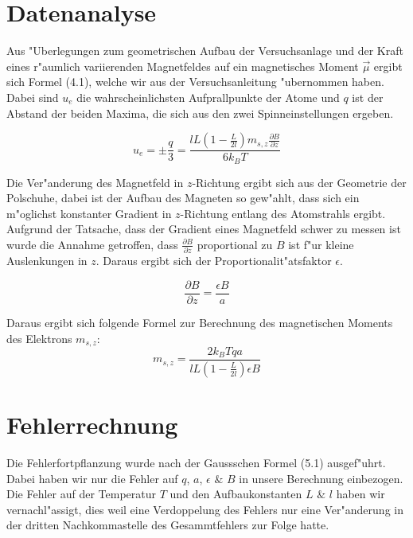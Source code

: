 \documentclass[a4paper,parskip,11pt, DIV12]{scrreprt}
\begin{document}
\clearpage


\chapter{Datenanalyse}\label{Datenanalyse}

Aus "Uberlegungen zum geometrischen Aufbau der Versuchsanlage und der Kraft eines r"aumlich variierenden Magnetfeldes auf ein magnetisches Moment $\vec{ \mu }$ ergibt sich Formel (4.1), welche wir aus der Versuchsanleitung "ubernommen haben. Dabei sind $u_e$ die wahrscheinlichsten Aufprallpunkte der Atome und $q$ ist der Abstand der beiden Maxima, die sich aus den zwei Spinneinstellungen ergeben.


\begin{equation}
u_e=\pm \frac{q}{3}=\frac{lL(1-\frac{L}{2l})m_{s,z} \frac{\partial B}{\partial z}}{6k_BT}
\end{equation}

Die Ver"anderung des Magnetfeld in $z$-Richtung ergibt sich aus der Geometrie der Polschuhe, dabei ist der Aufbau des Magneten so gew"ahlt, dass sich ein m"oglichst konstanter Gradient in $z$-Richtung entlang des Atomstrahls ergibt. Aufgrund der Tatsache, dass der Gradient eines Magnetfeld schwer zu messen ist wurde die Annahme getroffen, dass $\frac{ \partial B}{ \partial z}$ proportional zu $B$ ist f"ur kleine Auslenkungen in $z$. Daraus ergibt sich der Proportionalit"atsfaktor $\epsilon$.

\begin{equation}
\frac{\partial B}{\partial z}=\frac{\epsilon B}{a}
\end{equation}

Daraus ergibt sich folgende Formel zur Berechnung des magnetischen Moments des Elektrons $m_{s,z}$:
\begin{equation}
m_{s,z}=\frac{2k_BTqa}{lL(1-\frac{L}{2l})\epsilon B}
\end{equation}


\clearpage

\chapter{Fehlerrechnung}
Die Fehlerfortpflanzung wurde nach der Gaussschen Formel (5.1) ausgef"uhrt. Dabei haben wir nur die Fehler auf $q$, $a$, $\epsilon$ $\&$ $B$ in unsere Berechnung einbezogen. Die Fehler auf der Temperatur $T$ und den Aufbaukonstanten $L$ $\&$ $l$ haben wir vernachl"assigt, dies weil eine Verdoppelung des Fehlers nur eine Ver"anderung in der dritten Nachkommastelle des Gesammtfehlers zur Folge hatte.
\end{document}

